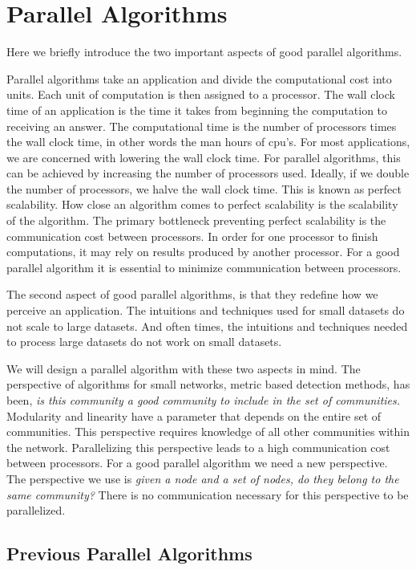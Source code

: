 \documentclass[phd,tocprelim]{cornell}
\begin{document}
\section{Parallel Algorithms}

Here we briefly introduce the two important aspects of good parallel algorithms.

Parallel algorithms take an application and divide the computational cost into units.  Each unit of computation is then assigned to a processor.  The wall clock time of an application is the time it takes from beginning the computation to receiving an answer.  The computational time is the number of processors times the wall clock time, in other words the man hours of cpu's.  For most applications, we are concerned with lowering the wall clock time.  For parallel algorithms, this can be achieved by increasing the number of processors used.  Ideally, if we double the number of processors, we halve the wall clock time.  This is known as perfect scalability.  How close an algorithm comes to perfect scalability is the scalability of the algorithm.  The primary bottleneck preventing perfect scalability is the communication cost between processors.  In order for one processor to finish computations, it may rely on results produced by another processor.   For a good parallel algorithm it is essential to minimize communication between processors.

The second aspect of good parallel algorithms, is that they redefine how we perceive an application.  The intuitions and techniques used for small datasets do not scale to large datasets.  And often times, the intuitions and techniques needed to process large datasets do not work on small datasets.

We will design a parallel algorithm with these two aspects in mind.  The perspective of algorithms for small networks, metric based detection methods, has been, {\it is this community a good community to include in the set of communities.}  Modularity and linearity have a parameter that depends on the entire set of communities.  This perspective requires knowledge of all other communities within the network.  Parallelizing this perspective leads to a high communication cost between processors.  For a good parallel algorithm we need a new perspective.  The perspective we use is {\it given a node and a set of nodes, do they belong to the same community?}  There is no communication necessary for this perspective to be parallelized.

\subsection{Previous Parallel Algorithms}
\end{document}

